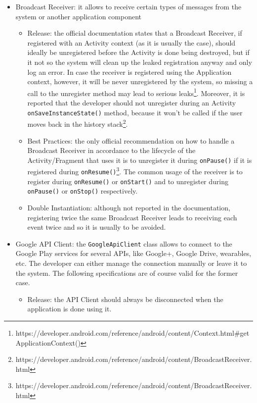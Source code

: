 \documentclass[11pt,a4paper,notitlepage]{article}
\begin{document}
\begin{itemize}
	\item Broadcast Receiver: it allows to receive certain types of messages from the system or another application component
	\begin{itemize}
		\item Release: the official documentation states that a Broadcast Receiver, if registered with an Activity context (as it is usually the case), should ideally be unregistered before the Activity is done being destroyed, but if it not so the system will clean up the leaked registration anyway and only log an error. In case the receiver is registered using the Application context, however, it will be never unregistered by the system, so missing a call to the unregister method may lead to serious leaks\footnote{https://developer.android.com/reference/android/content/Context.html\#getApplicationContext()}. Moreover, it is reported that the developer should not unregister during an Activity \texttt{onSaveInstanceState()} method, because it won't be called if the user moves back in the history stack\footnote{https://developer.android.com/reference/android/content/BroadcastReceiver.html}.
		\item Best Practices: the only official recommendation on how to handle a Broadcast Receiver in accordance to the lifecycle of the Activity/Fragment that uses it is to unregister it during \texttt{onPause()} if it is registered during \texttt{onResume()}\footnote{https://developer.android.com/reference/android/content/BroadcastReceiver.html}. The common usage of the receiver is to register during \texttt{onResume()} or \texttt{onStart()} and to unregister during \texttt{onPause()} or \texttt{onStop()} respectively.
		\item Double Instantiation: although not reported in the documentation, registering twice the same Broadcast Receiver leads to receiving each event twice and so it is usually to be avoided.
	\end{itemize}
	\item Google API Client: the \texttt{GoogleApiClient} class allows to connect to the Google Play services for several APIs, like Google+, Google Drive, wearables, etc. The developer can either manage the connection manually or leave it to the system. The following specifications are of course valid for the former case.
	\begin{itemize}
		\item Release: the API Client should always be disconnected when the application is done using it.

\end{itemize}
\end{itemize}
\end{document}
